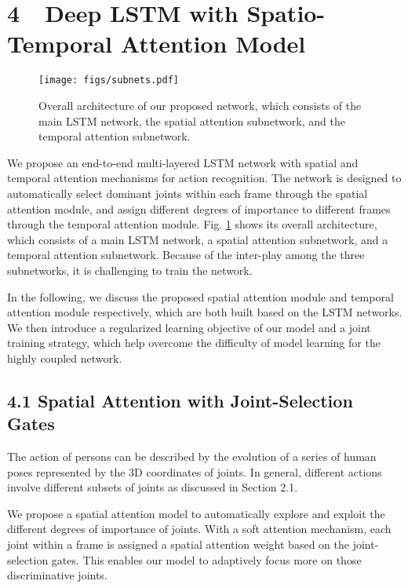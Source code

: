 \documentclass[letterpaper]{article}
\begin{document}
\section{4~~Deep LSTM with Spatio-Temporal Attention Model}
\label{sec:algorithm}
\begin{figure}[t] \begin{center}
		\texttt{[image: figs/subnets.pdf]}
	\end{center}
\vspace{-4mm}
	\caption{Overall architecture of our proposed network, which consists of the main LSTM network, the spatial attention subnetwork, and the temporal attention subnetwork.}
	\label{fig:Subnets}
\vspace{1.8mm}
\end{figure}
We propose an end-to-end multi-layered LSTM network with spatial and temporal attention mechanisms for action recognition. The network is designed to automatically select dominant joints within each frame through the spatial attention module, and assign different degrees of importance to different frames through the temporal attention module. Fig. \ref{fig:Subnets} shows its overall architecture, which consists of a main LSTM network, a spatial attention subnetwork, and a temporal attention subnetwork. Because of the inter-play among the three subnetworks, it is challenging to train the network.


In the following, we discuss the proposed spatial attention module and temporal attention module respectively, which are both built based on the LSTM networks. We then introduce a regularized learning objective of our model and a joint training strategy, which help overcome the difficulty of model learning for the highly coupled network.





\subsection{4.1 Spatial Attention with Joint-Selection Gates}

The action of persons can be described by the evolution of a series of human poses represented by the 3D coordinates of joints. In general, different actions involve different subsets of joints as discussed in Section 2.1. 

We propose a spatial attention model to automatically explore and exploit the different degrees of importance of joints. With a soft attention mechanism, each joint within a frame is assigned a spatial attention weight based on the joint-selection gates. This enables our model to adaptively focus more on those discriminative joints.
\end{document}
